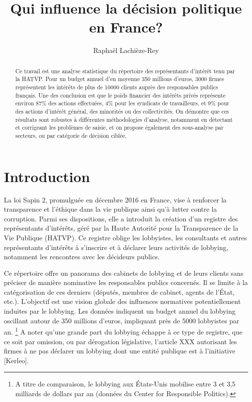\documentclass[a4paper,12pt]{article}
\title{Qui influence la décision politique en France?}
\author[1]{Rapha\"el Lachièze-Rey}
\begin{document}
\maketitle

\begin{abstract}
  Ce travail est une analyse statistique  du répertoire des représentants d’intérêt tenu par la HATVP. Pour un budget annuel d'en moyenne 350 millions d'euros, 3000 firmes représentent les intér\^ets de plus de 10000 clients auprès des responsables publics fran\c cais. Une des conclusion est que le poids financier des intérêts privés représente environ 87\% des actions effectuées, 4\% pour les syndicats de travailleurs, et  9\% pour des actions d'intér\^et général, des minorités ou des collectivités. On démontre que ces résultats sont  robustes à différentes méthodologies d'analyse, notamment en détectant et corrigeant les problèmes de saisie, et on propose également des sous-analyse par secteurs, ou par catégorie de décision ciblée. 

\end{abstract}

\tableofcontents

\section{Introduction}
 
La loi Sapin 2, promulguée en décembre 2016 en France, vise à renforcer la transparence et l'éthique dans la vie publique ainsi qu'à lutter contre la corruption. Parmi ses dispositions, elle a introduit la création d'un registre des représentants d'intérêts, géré par la Haute Autorité pour la Transparence de la Vie Publique (HATVP). Ce registre oblige les lobbyistes, les consultants et autres représentants d'intérêts à s'inscrire et à déclarer leurs activités de lobbying, notamment les rencontres avec les décideurs publics.  

Ce répertoire offre un panorama des cabinets de lobbying et de leurs clients sans préciser de manière nominative les responsables publics concernés. Il se limite à la catégorisation de ces derniers (députés, membres de cabinet, agents de l'État, etc.). L'objectif est   une vision globale des influences normatives potentiellement induites par le lobbying.  Les données   indiquent un budget annuel du lobbying oscillant autour de 350 millions d'euros, impliquant près de 5000 lobbyistes par an.  \footnote{ A titre de comparaison, le lobbying aux États-Unis mobilise entre 3 et 3,5 milliards de dollars par an (données du Center for Responsible Politics).} A noter qu'une grande part du lobbying échappe à ce type de registre, que ce soit par omission, ou par dérogation législative, l'article XXX  autorisant les firmes à ne pas déclarer un lobbying dont une entité publique est à l'initiative [Kerleo].\\
\end{document}
